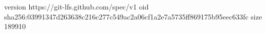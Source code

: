 version https://git-lfs.github.com/spec/v1
oid sha256:03991347d263638c216c277c549ac2a06cf1a2e7a5735ff869175b95eec633fc
size 189910
